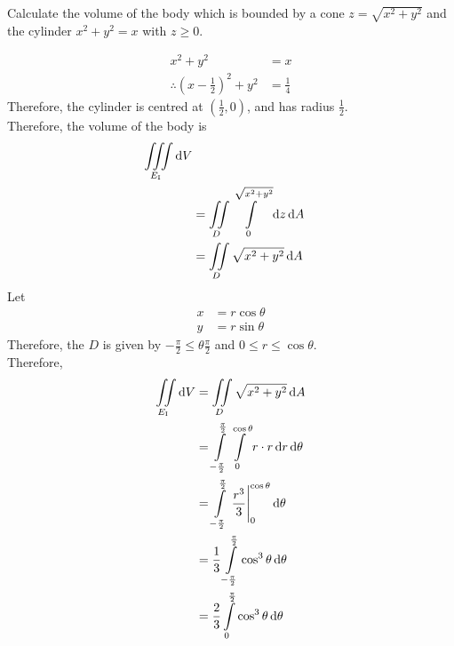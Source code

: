 \documentclass[fleqn, a4paper, 12pt, twoside]{article}
\theoremstyle{definition}
\theoremstyle{theorem}
\begin{document}
\begin{question}
	Calculate the volume of the body which is bounded by a cone $z = \sqrt{x^2 + y^2}$ and the cylinder $x^2 + y^2 = x$ with $z \ge 0$.
\end{question}

\begin{solution}
	\begin{align*}
		x^2 + y^2                                         & = x \\
		\therefore \left( x - \frac{1}{2} \right)^2 + y^2 & = \frac{1}{4}
	\end{align*}
	Therefore, the cylinder is centred at $\left( \frac{1}{2} , 0 \right)$, and has radius $\frac{1}{2}$.\\
	Therefore, the volume of the body is
	\begin{align*}
		\iiint\limits_{E_{\mathrm{I}}} \dif V \\
                                                       & = \iint\limits_{D} \int\limits_{0}^{\sqrt{x^2 + y^2}} \dif z \dif A \\
                                                       & = \iint\limits_{D} \sqrt{x^2 + y^2} \dif A
	\end{align*}
	Let
	\begin{align*}
		x & = r \cos \theta \\
		y & = r \sin \theta
	\end{align*}
	Therefore, the $D$ is given by $-\frac{\pi}{2} \le \theta \frac{\pi}{2}$ and $0 \le r \le \cos \theta$.\\
	Therefore,
	\begin{align*}
		\iint\limits_{E_{\mathrm{I}}} \dif V & = \iint\limits_{D} \sqrt{x^2 + y^2} \dif A                                                                       \\
                                                     & = \int\limits_{-\frac{\pi}{2}}^{\frac{\pi}{2}} \int\limits_{0}^{\cos \theta} r \cdot r \dif r \dif \theta        \\
                                                     & = \int\limits_{-\frac{\pi}{2}}^{\frac{\pi}{2}} \left. \frac{r^3}{3} \right|_{0}^{\cos \theta} \dif \theta        \\
                                                     & = \frac{1}{3} \int\limits_{-\frac{\pi}{2}}^{\frac{\pi}{2}} \cos^3 \theta \dif \theta                             \\
                                                     & = \frac{2}{3} \int\limits_{0}^{\frac{\pi}{2}} \cos^3 \theta \dif \theta                                          \\

\end{align*}
\end{solution}
\end{document}
